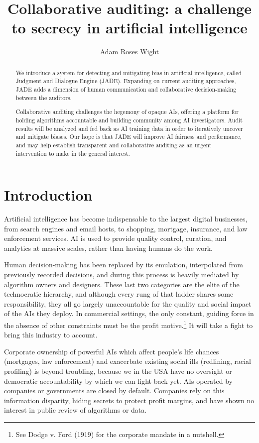 \documentclass[format=sigconf]{acmart}
\title{Collaborative auditing: a challenge to secrecy in artificial intelligence}
\author{Adam Roses Wight}
\affiliation{Wikimedia Foundation}
\begin{document}
\begin{abstract}
We introduce a system for detecting and mitigating bias in artificial intelligence, called Judgment and Dialogue Engine (JADE).  Expanding on current auditing approaches, JADE adds a dimension of human communication and collaborative decision-making between the auditors.

Collaborative auditing challenges the hegemony of opaque AIs, offering a platform for holding algorithms accountable and building community among AI investigators.  Audit results will be analyzed and fed back as AI training data in order to iteratively uncover and mitigate biases.  Our hope is that JADE will improve AI fairness and performance, and may help establish transparent and collaborative auditing as an urgent intervention to make in the general interest.
\end{abstract}

\maketitle

\section{Introduction}

Artificial intelligence has become indispensable to the largest digital businesses, from search engines and email hosts, to shopping, mortgage, insurance, and law enforcement services.  AI is used to provide quality control, curation, and analytics at massive scales, rather than having humans do the work.

Human decision-making has been replaced by its emulation, interpolated from previously recorded decisions, and during this process is heavily mediated by algorithm owners and designers.  These last two categories are the elite of the technocratic hierarchy, and although every rung of that ladder shares some responsibility, they all go largely unaccountable for the quality and social impact of the AIs they deploy.  In commercial settings, the only constant, guiding force in the absence of other constraints must be the profit motive.\footnote{See Dodge v. Ford (1919) for the corporate mandate in a nutshell.}  It will take a fight to bring this industry to account.

Corporate ownership of powerful AIs which affect people's life chances (mortgages, law enforcement) and exacerbate existing social ills (redlining, racial profiling) is beyond troubling, because we in the USA have no oversight or democratic accountability by which we can fight back yet.  AIs operated by companies or governments are closed by default.  Companies rely on this information disparity, hiding secrets to protect profit margins, and have shown no interest in public review of algorithms or data.
\end{document}
